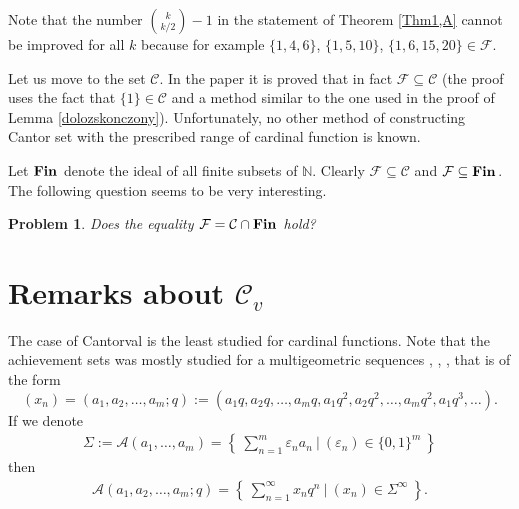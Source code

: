 \documentclass{amsart}
\newtheorem{problem}[theorem]{Problem}
\theoremstyle{definition}
\newcommand{\Fin}{ {\rm \bf Fin} \hspace{0.03cm}}
\newcommand{\Cv}{\mathcal{C}_{v}}
\begin{document}
Note that the number $\binom{k}{k/2}-1$ in the statement of Theorem \ref{Thm1,A} cannot be improved for all $k$ because for example $\{1,4,6\}$, $\{1,5,10\}$, $\{1,6,15,20\}\in \mathcal{F}$.


Let us move to the set $\mathcal{C}$. In the paper \cite{cardfun} it is proved that in fact $\mathcal{F}\subseteq \mathcal{C}$ (the proof uses the fact that $\{1\}\in \mathcal{C}$ and a method similar to the one used in the proof of Lemma \ref{dolozskonczony}). Unfortunately, no other method of constructing Cantor set with the prescribed range of cardinal function is known.

Let $\Fin$ denote the ideal of all finite subsets of $\mathbb{N}$. Clearly $\mathcal{F}\subseteq \mathcal{C}$ and $\mathcal{F}\subseteq \Fin$. The following question seems to be very interesting.

\begin{problem}
Does the equality $\mathcal{F}=\mathcal{C}\cap \Fin$ hold?
\end{problem}


\section{Remarks about $\Cv$}
The case of Cantorval is the least studied for cardinal functions. 
Note that the achievement sets was mostly studied for a multigeometric sequences \cite{BBFS}, \cite{BBGS}, \cite{BFS}, that is of the form 
$$(x_n)=(a_1,a_2,\ldots,a_m;q):=(a_1q,a_2q,\ldots,a_mq,a_1q^2, a_2q^2,\ldots,a_mq^2,a_1q^3,\ldots).$$
If we denote
\begin{align*}
\Sigma:=\mathcal{A}(a_1,\ldots,a_m)=  \left\{\ \sum_{n=1}^{m}\varepsilon_na_n \ \Bigg|\ (\varepsilon_n)\in\{0,1\}^{m}\ \right\}
\end{align*}
then
\begin{align*}
\mathcal{A}(a_1,a_2,\ldots,a_m;q)=\left\{\ \sum_{n=1}^{\infty}x_nq^n\ \Bigg| \ (x_n)\in\Sigma^{\infty}\ \right\}.
\end{align*}
\end{document}

